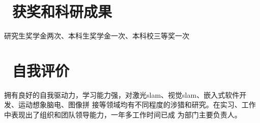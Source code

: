 \documentclass{resume}
\begin{document}






\section{\textcolor[RGB]{50,50,190}{\faPaperPlane\ 获奖和科研成果}}
研究生奖学金两次、本科生奖学金一次、本科校三等奖一次
\section{\textcolor[RGB]{50,50,190}{\faChild\ 自我评价}}
拥有良好的自我驱动力，学习能力强，对激光slam、视觉slam、嵌入式软件开发、运动想象脑电、图像拼
接等领域均有不同程度的涉猎和研究。在实习、工作中表现出了组织和团队领导能力，一年多工作时间已成
为部门主要负责人。



%
%
\end{document}
